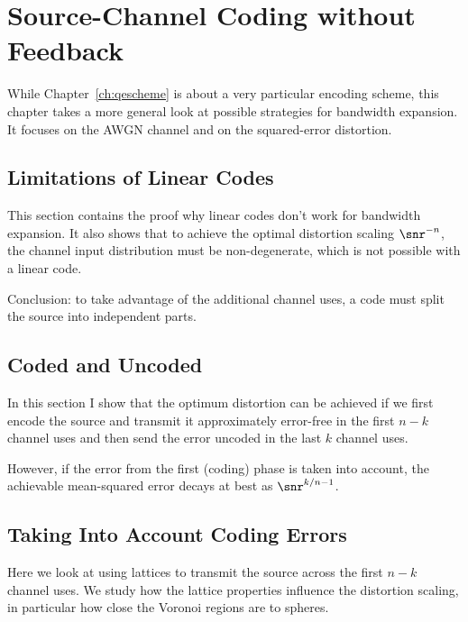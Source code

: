 \chapter{Source-Channel Coding without Feedback}
\label{ch:nofeedback}

While Chapter~\ref{ch:qescheme} is about a very particular encoding scheme, this
chapter takes a more general look at possible strategies for bandwidth
expansion. It focuses on the AWGN channel and on the squared-error distortion. 

\section{Limitations of Linear Codes}

This section contains the proof why linear codes don't work for bandwidth
expansion. It also shows that to achieve the optimal distortion scaling
$\snr^{-n}$, the channel input distribution must be non-degenerate, which is not
possible with a linear code. 

Conclusion: to take advantage of the additional channel uses, a code must split
the source into independent parts. 


\section{Coded and Uncoded}

In this section I show that the optimum distortion can be achieved if we first
encode the source and transmit it approximately error-free in the first $n-k$
channel uses and then send the error uncoded in the last $k$ channel uses.

However, if the error from the first (coding) phase is taken into account, the
achievable mean-squared error decays at best as $\snr^{k/n-1}$. 


\section{Taking Into Account Coding Errors}

Here we look at using lattices to transmit the source across the first $n-k$
channel uses. We study how the lattice properties influence the distortion
scaling, in particular how close the Voronoi regions are to spheres. 
